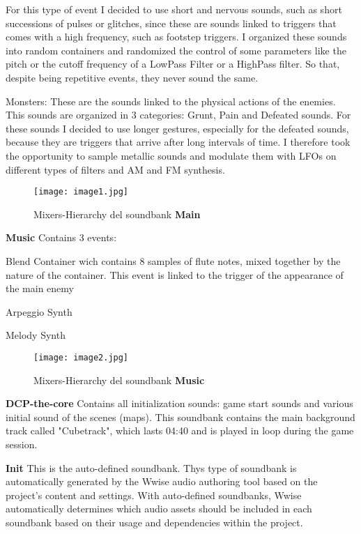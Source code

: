 \begin{compactitem}
\begin{compactitem}
				For this type of event I decided to use short and nervous sounds, such as short successions of pulses or glitches, since these are sounds linked to triggers that comes with a high frequency, such as footstep triggers.
				I organized these sounds into random containers and randomized the control of some parameters like the pitch or the cutoff frequency of a LowPass Filter or a HighPass filter. So that, despite being repetitive events, they never sound the same.
				\item Monsters: These are the sounds linked to the physical actions of the enemies. This sounds are organized in 3 categories: Grunt, Pain and Defeated sounds.
				For these sounds I decided to use longer gestures, especially for the defeated sounds, because they are triggers that arrive after long intervals of time. I therefore took the opportunity to sample metallic sounds and modulate them with LFOs on different types of filters and AM and FM synthesis.
			\end{compactitem}
		
		\begin{figure}[h]
			\begin{center}
				\texttt{[image: image1.jpg]}
				\caption{Mixers-Hierarchy del soundbank \textbf{Main}}
			\end{center}
		\end{figure}
		
		\item \textbf{Music} Contains 3 events:
			\begin{compactitem}
				\item Blend Container wich contains 8 samples of flute notes, mixed together by the nature of the container. This event is linked to the trigger of the appearance of the main enemy
				\item Arpeggio Synth
				\item Melody Synth
			\end{compactitem}
		\begin{figure}[h]
			\begin{center}
				\texttt{[image: image2.jpg]}
				\caption{Mixers-Hierarchy del soundbank \textbf{Music}}
			\end{center}
		\end{figure}
		
		\item \textbf{DCP-the-core} Contains all initialization sounds: game start sounds and various initial sound of the scenes (maps). This soundbank contains the main background track called "Cubetrack", which lasts 04:40 and is played in loop during the game session.
		\item \textbf{Init} This is the auto-defined soundbank. Thys type of soundbank is automatically generated by the Wwise audio authoring tool based on the project's content and settings.		
		With auto-defined soundbanks, Wwise automatically determines which audio assets should be included in each soundbank based on their usage and dependencies within the project.
	\end{compactitem}

